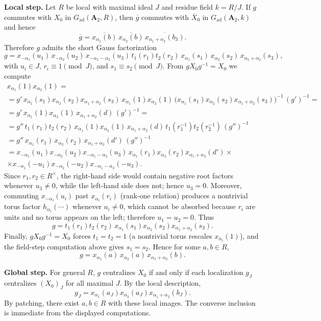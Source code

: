 \documentclass[]{jgcc}
\numberwithin{equation}{section}
\begin{document}
\medskip
\noindent\textbf{Local step.}
Let $R$ be local with maximal ideal $J$ and residue field $k=R/J$.
If $g$ commutes with $X_0$ in $G_{\mathrm{ad}}(\mathbf A_2,R)$, then $\overline g$ commutes with $\overline X_0$ in $G_{\mathrm{ad}}(\mathbf A_2,k)$ and hence
\[
\overline g=\overline{x_{\alpha_1}(b)}\,\overline{x_{\alpha_2}(b)}\,\overline{x_{\alpha_1+\alpha_2}(b_3)}.
\]
Therefore $g$ admits the short Gauss factorization
\[
g=x_{-\alpha_1}(u_1)\,x_{-\alpha_2}(u_2)\,x_{-\alpha_1-\alpha_2}(u_3)\,t_1(r_1)t_2(r_2)\,
x_{\alpha_1}(s_1)\,x_{\alpha_2}(s_2)\,x_{\alpha_1+\alpha_2}(s_3),
\]
with $u_i\in J$, $r_i\equiv 1\pmod J$, and $s_1\equiv s_2\pmod J$.
From $gX_0g^{-1}=X_0$ we compute
\begin{multline*}
x_{\alpha_1}(1)x_{\alpha_2}(1)
=\\
=g'\,x_{\alpha_1}(s_1)x_{\alpha_2}(s_2)x_{\alpha_1+\alpha_2}(s_3)\,x_{\alpha_1}(1)x_{\alpha_2}(1)\,
\bigl(x_{\alpha_1}(s_1)x_{\alpha_2}(s_2)x_{\alpha_1+\alpha_2}(s_3)\bigr)^{-1}\,(g')^{-1}=\\
= g'\,x_{\alpha_1}(1)x_{\alpha_2}(1)\,x_{\alpha_1+\alpha_2}(d)\,(g')^{-1}
=\\
=g''\,t_1(r_1)t_2(r_2)\,x_{\alpha_1}(1)x_{\alpha_2}(1)\,x_{\alpha_1+\alpha_2}(d)\,t_1(r_1^{-1})t_2(r_2^{-1})\,(g'')^{-1}\\
= g''\,x_{\alpha_1}(r_1)\,x_{\alpha_2}(r_2)\,x_{\alpha_1+\alpha_2}(d')\,(g'')^{-1}\\
= x_{-\alpha_1}(u_1)x_{-\alpha_2}(u_2)x_{-\alpha_1-\alpha_2}(u_3)\,x_{\alpha_1}(r_1)x_{\alpha_2}(r_2)x_{\alpha_1+\alpha_2}(d')\times\\
\times
x_{-\alpha_1}(-u_1)x_{-\alpha_2}(-u_2)x_{-\alpha_1-\alpha_2}(-u_3).
\end{multline*}
Since $r_1,r_2\in R^\times$, the right-hand side would contain negative root factors whenever $u_3\neq 0$, while the left-hand side does not; hence $u_3=0$.
Moreover, commuting $x_{-\alpha_i}(u_i)$ past $x_{\alpha_i}(r_i)$ (rank-one relation) produces a nontrivial torus factor $h_{\alpha_i}(\cdots)$
whenever $u_i\neq 0$, which cannot be absorbed because $r_i$ are units and no torus appears on the left;
therefore $u_1=u_2=0$.
Thus
\[
g=t_1(r_1)t_2(r_2)\,x_{\alpha_1}(s_1)x_{\alpha_2}(s_2)x_{\alpha_1+\alpha_2}(s_3).
\]
Finally, $gX_0g^{-1}=X_0$ forces $t_1=t_2=1$ (a nontrivial torus rescales $x_{\alpha_i}(1)$), and the field-step computation above gives $s_1=s_2$.
Hence for some $a,b\in R$,
\[
g=x_{\alpha_1}(a)\,x_{\alpha_2}(a)\,x_{\alpha_1+\alpha_2}(b).
\]

\medskip
\noindent\textbf{Global step.}
For general $R$, $g$ centralizes $X_0$ if and only if each localization $g_J$ centralizes $(X_0)_J$ for all maximal $J$.
By the local description,
$$
g_J=x_{\alpha_1}(a_J)x_{\alpha_2}(a_J)x_{\alpha_1+\alpha_2}(b_J).
$$
By patching, there exist $a,b\in R$ with these local images. The converse inclusion is immediate from the displayed computations.
\end{document}
